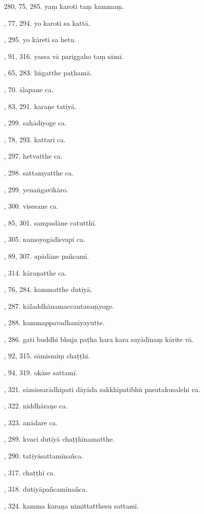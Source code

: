 280, 75, 285. yaṃ karoti taṃ kammaṃ.\par {}, 77, 294. yo karoti sa kattā.\par {}, 295. yo kāreti sa hetu.\par {}, 91, 316. yassa vā pariggaho taṃ sāmī.\par {}, 65, 283. liṅgatthe paṭhamā.\par {}, 70. ālapane ca.\par {}, 83, 291. karaṇe tatiyā.\par {}, 299. sahādiyoge ca.\par {}, 78, 293. kattari ca.\par {}, 297. hetvatthe ca.\par {}, 298. sattamyatthe ca.\par {}, 299. yenaṅgavikāro.\par {}, 300. visesane ca.\par {}, 85, 301. sampadāne catutthī.\par {}, 305. namoyogādīsvapi ca.\par {}, 89, 307. apādāne pañcamī.\par {}, 314. kāraṇatthe ca.\par {}, 76, 284. kammatthe dutiyā.\par {}, 287. kāladdhānamaccantasaṃyoge.\par {}, 288. kammappavadhanīyayutte.\par {}, 286. gati buddhi bhuja paṭha hara kara sayādīnaṃ kārite vā.\par {}, 92, 315. sāmismiṃ chaṭṭhī.\par {}, 94, 319. okāse sattamī.\par {}, 321. sāmissarādhipati dāyāda sakkhīpatibhū pasutakusalehi ca.\par {}, 322. niddhāraṇe ca.\par {}, 323. anādare ca.\par {}, 289. kvaci dutiyā chaṭṭhīnamatthe.\par {}, 290. tatiyāsattamīnañca.\par {}, 317. chaṭṭhī ca.\par {}, 318. dutiyāpañcamīnañca.\par {}, 324. kamma karaṇa nimittatthesu sattamī.\par \noindent
